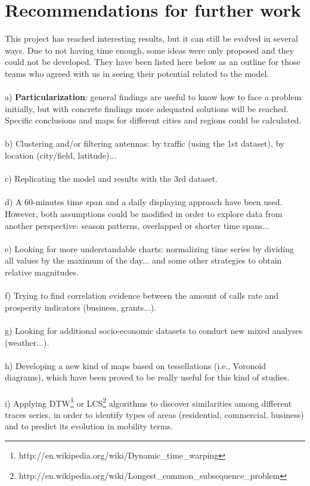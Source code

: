 \newpage
\section{Recommendations for further work}

This project has reached interesting results, but it can still be evolved in several ways. Due to not having time enough, some ideas were only proposed and they could not be developed. They have been listed here below as an outline for those teams who agreed with us in seeing their potential related to the model.
\\
\\
a) {\bf Particularization}: general findings are useful to know how to face a problem initially, but with concrete findings more adequated solutions will be reached. Specific conclusions and maps for different cities and regions could be calculated.
\\
\\
b) Clustering and/or filtering antennas: by traffic (using the 1st dataset), by location (city/field, latitude)...
\\
\\
c) Replicating the model and results with the 3rd dataset.
\\
\\
d) A 60-minutes time span and a daily displaying approach have been used. However, both assumptions could be modified in order to explore data from another perspective: season patterns, overlapped or shorter time spans...
\\
\\
e) Looking for more understandable charts: normalizing time series by dividing all values by the maximum of the day... and some other strategies to obtain relative magnitudes.
\\
\\
f) Trying to find correlation evidence between the amount of calls rate and prosperity indicators (business, grants...).
\\
\\
g) Looking for additional socio-economic datasets to conduct new mixed analyses (weather...).
\\
\\
h) Developing a new kind of maps based on tessellations (i.e., Voronoid diagrams), which have been proved to be really useful for this kind of studies.
\\
\\
i) Applying DTW\footnote{http://en.wikipedia.org/wiki/Dynamic\_time\_warping} or LCS\footnote{http://en.wikipedia.org/wiki/Longest\_common\_subsequence\_problem} algorithms to discover similarities among different traces series, in order to identify types of areas (residential, commercial, business) and to predict its evolution in mobility terms.

